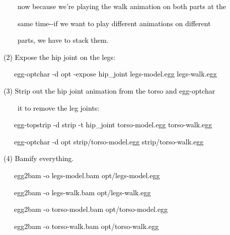 \documentclass[a4paper]{article}
\newcommand\textstyleOOoComputerKeyWord[1]{\textrm{\textcolor[rgb]{0.0,0.0,0.5019608}{#1}}}
\begin{document}
{\color{black}
\textstyleOOoComputerKeyWord{\textcolor{black}{\ \ \ \ now because we're playing the walk animation on both parts at
the}}}

{\color{black}
\textstyleOOoComputerKeyWord{\textcolor{black}{\ \ \ \ same time-{}-if we want to play different animations on
different}}}

{\color{black}
\textstyleOOoComputerKeyWord{\textcolor{black}{\ \ \ \ parts, we have to stack them.}}}


\bigskip

{\color{black}
\textstyleOOoComputerKeyWord{\textcolor{black}{(2) Expose the hip joint on the legs:}}}


\bigskip

{\color{black}
\textstyleOOoComputerKeyWord{\textcolor{black}{\ \ \ egg-optchar -d opt -expose hip\_joint legs-model.egg
legs-walk.egg}}}


\bigskip

{\color{black}
\textstyleOOoComputerKeyWord{\textcolor{black}{(3) Strip out the hip joint animation from the torso and egg-optchar}}}

{\color{black}
\textstyleOOoComputerKeyWord{\textcolor{black}{\ \ \ \ it to remove the leg joints:}}}


\bigskip

{\color{black}
\textstyleOOoComputerKeyWord{\textcolor{black}{\ \ \ egg-topstrip -d strip -t hip\_joint torso-model.egg
torso-walk.egg}}}

{\color{black}
\textstyleOOoComputerKeyWord{\textcolor{black}{\ \ \ egg-optchar -d opt strip/torso-model.egg strip/torso-walk.egg}}}


\bigskip

{\color{black}
\textstyleOOoComputerKeyWord{\textcolor{black}{(4) Bamify everything.}}}


\bigskip

{\color{black}
\textstyleOOoComputerKeyWord{\textcolor{black}{\ \ \ egg2bam -o legs-model.bam opt/legs-model.egg}}}

{\color{black}
\textstyleOOoComputerKeyWord{\textcolor{black}{\ \ \ egg2bam -o legs-walk.bam opt/legs-walk.egg}}}

{\color{black}
\textstyleOOoComputerKeyWord{\textcolor{black}{\ \ \ egg2bam -o torso-model.bam opt/torso-model.egg}}}

{\color{black}
\textstyleOOoComputerKeyWord{\textcolor{black}{\ \ \ egg2bam -o torso-walk.bam opt/torso-walk.egg}}}


\bigskip
\end{document}
